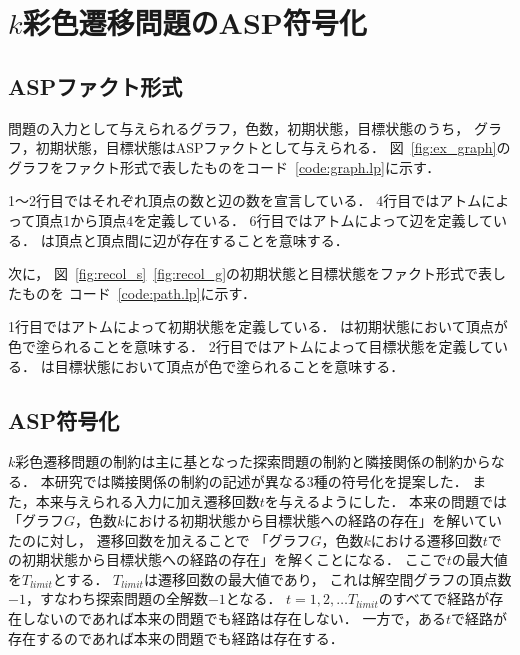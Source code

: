 \chapter{$k$彩色遷移問題のASP符号化} \label{chap:proposal}

\section{ASPファクト形式}
問題の入力として与えられるグラフ，色数，初期状態，目標状態のうち，
グラフ，初期状態，目標状態はASPファクトとして与えられる．
図~\ref{fig:ex_graph}のグラフをファクト形式で表したものをコード~\ref{code:graph.lp}に示す．



1～2行目ではそれぞれ頂点の数と辺の数を宣言している．
4行目ではアトムによって頂点1から頂点4を定義している．
6行目ではアトムによって辺を定義している．
は頂点と頂点間に辺が存在することを意味する．

次に， 図~\ref{fig:recol_s}~\ref{fig:recol_g}の初期状態と目標状態をファクト形式で表したものを
コード~\ref{code:path.lp}に示す．



1行目ではアトムによって初期状態を定義している．
は初期状態において頂点が色で塗られることを意味する．
2行目ではアトムによって目標状態を定義している．
は目標状態において頂点が色で塗られることを意味する．

\section{ASP符号化}
$k$彩色遷移問題の制約は主に基となった探索問題の制約と隣接関係の制約からなる．
本研究では隣接関係の制約の記述が異なる3種の符号化を提案した．
また，本来与えられる入力に加え遷移回数$t$を与えるようにした．
本来の問題では「グラフ$G$，色数$k$における初期状態から目標状態への経路の存在」を解いていたのに対し，
遷移回数を加えることで
「グラフ$G$，色数$k$における遷移回数$t$での初期状態から目標状態への経路の存在」を解くことになる．
ここで$t$の最大値を$T_{limit}$とする．
$T_{limit}$は遷移回数の最大値であり，
これは解空間グラフの頂点数$-1$，すなわち探索問題の全解数$-1$となる．
$t=1, 2, \dots T_{limit}$のすべてで経路が存在しないのであれば本来の問題でも経路は存在しない．
一方で，ある$t$で経路が存在するのであれば本来の問題でも経路は存在する．

